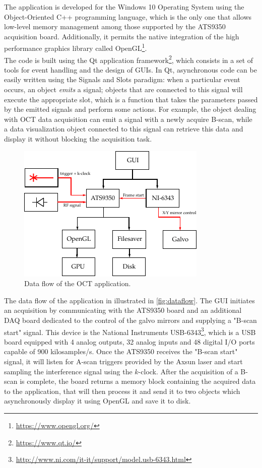 
\noindent The application is developed for the Windows 10 Operating System using the Object-Oriented C++ programming language, which is the only one that allows low-level memory management among those supported by the ATS9350 acquisition board. Additionally, it permits the native integration of the high performance graphics library called OpenGL\footnote{\url{https://www.opengl.org/}}. \\


The code is built using the Qt application framework\footnote{\url{https://www.qt.io/}}, which consists in a set of tools for event handling and the design of \acp{GUI}. In Qt, asynchronous code can be easily written using the Signals and Slots paradigm: when a particular event occurs, an object \emph{emits} a signal; objects that are connected to this signal will execute the appropriate slot, which is a function that takes the parameters passed by the emitted signals and perform some actions. For example, the object dealing with OCT data acquisition can emit a signal with a newly acquire B-scan, while a data visualization object connected to this signal can retrieve this data and display it without blocking the acquisition task. 

\begin{figure}[htb]
	\myfloatalign
	\includegraphics[width=0.6\linewidth]{gfx/ch4/dataflow}
	\caption{Data flow of the OCT application.}\label{fig:dataflow}
\end{figure}

The data flow of the application in illustrated in \autoref{fig:dataflow}. The \ac{GUI} initiates an acquisition by communicating with the ATS9350 board and an additional \ac{DAQ} board dedicated to the control of the galvo mirrors and supplying a "B-scan start" signal. This device is the National Instruments USB-6343\footnote{\url{http://www.ni.com/it-it/support/model.usb-6343.html}}, which is a USB board equipped with 4 analog outputs, 32 analog inputs and 48 digital I/O ports capable of 900 kilosamples/s. Once the ATS9350 receives the "B-scan start" signal, it will listen for A-scan triggers provided by the Axsun laser and start sampling the interference signal using the $k$-clock. After the acquisition of a B-scan is complete, the board returns a memory block containing the acquired data to the application, that will then process it and send it to two objects which asynchronously display it using OpenGL and save it to disk. 

